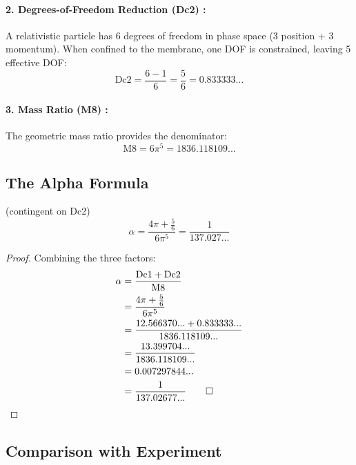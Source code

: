 \paragraph{2. Degrees-of-Freedom Reduction (Dc2) \tagP{}:}
A relativistic particle has 6 degrees of freedom in phase space (3 position + 3 momentum).
When confined to the membrane, one DOF is constrained, leaving 5 effective DOF:
\begin{equation}
\text{Dc2} = \frac{6-1}{6} = \frac{5}{6} = 0.833333...
\label{eq:ch2_dc2}
\end{equation}

\paragraph{3. Mass Ratio (M8) \tagM{}:}
The geometric mass ratio provides the denominator:
\begin{equation}
\text{M8} = 6\pi^5 = 1836.118109...
\label{eq:ch2_m8}
\end{equation}

\subsection{The Alpha Formula}

\begin{theorem}
\label{thm:ch2_alpha}
\tagDc{} (contingent on Dc2)
\begin{equation}
\boxed{\alpha = \frac{4\pi + \frac{5}{6}}{6\pi^5} = \frac{1}{137.027...}}
\label{eq:ch2_alpha}
\end{equation}
\end{theorem}

\begin{proof}
Combining the three factors:
\begin{align}
\alpha &= \frac{\text{Dc1} + \text{Dc2}}{\text{M8}} \\
&= \frac{4\pi + \frac{5}{6}}{6\pi^5} \\
&= \frac{12.566370... + 0.833333...}{1836.118109...} \\
&= \frac{13.399704...}{1836.118109...} \\
&= 0.007297844... \\
&= \frac{1}{137.02677...} \qed
\label{eq:ch2_alpha_derivation}
\end{align}
\end{proof}

\subsection{Comparison with Experiment}

